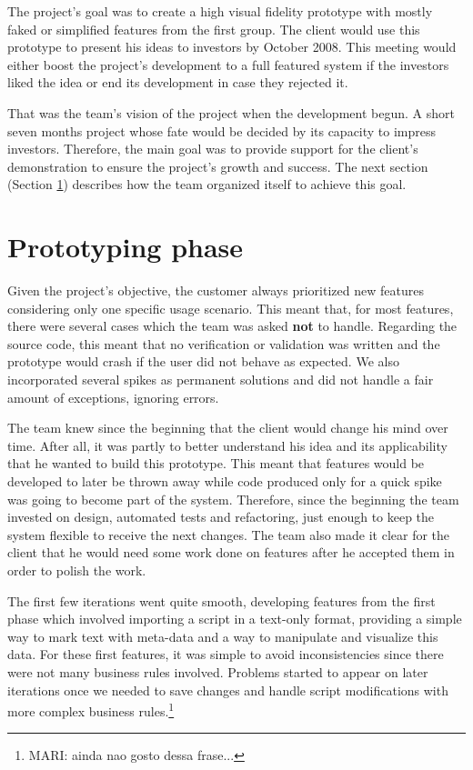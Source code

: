 \documentclass[lnbip]{svmultln}
\newcommand{\mari}[1]{\footnote{MARI: #1}}
\begin{document}
The project's goal was to create a high visual fidelity prototype with mostly
faked or simplified features from the first group. The client would use this
prototype to present his ideas to investors by October 2008. This meeting would
either boost the project's development to a full featured system if the
investors liked the idea or end its development in case they rejected it.

That was the team's vision of the project when the development begun. A short
seven months project whose fate would be decided by its capacity to impress
investors. Therefore, the main goal was to provide support for the client's
demonstration to ensure the project's growth and success. The next section
(Section \ref{sec:working}) describes how the team organized itself to achieve
this goal.

\section{Prototyping phase}
\label{sec:working}

Given the project's objective, the customer always prioritized new features
considering only one specific usage scenario. This meant that, for most
features, there were several cases which the team was asked \textbf{not} to
handle. Regarding the source code, this meant that no verification or validation
was written and the prototype would crash if the user did not behave as
expected. We also incorporated several spikes as permanent solutions and did not
handle a fair amount of exceptions, ignoring errors.

The team knew since the beginning that the client would change his mind over
time. After all, it was partly to better understand his idea and its
applicability that he wanted to build this prototype. This meant that features
would be developed to later be thrown away while code produced only for a quick
spike was going to become part of the system. Therefore, since the beginning the
team invested on design, automated tests and refactoring, just enough to keep
the system flexible to receive the next changes. The team also made it clear for
the client that he would need some work done on features after he accepted them
in order to polish the work.

The first few iterations went quite smooth, developing features from the first
phase which involved importing a script in a text-only format, providing a
simple way to mark text with meta-data and a way to manipulate and visualize
this data. For these first features, it was simple to avoid inconsistencies
since there were not many business rules involved. Problems started to appear on
later iterations once we needed to save changes and handle script modifications
with more complex business rules.\mari{ainda nao gosto dessa frase...}
\end{document}
